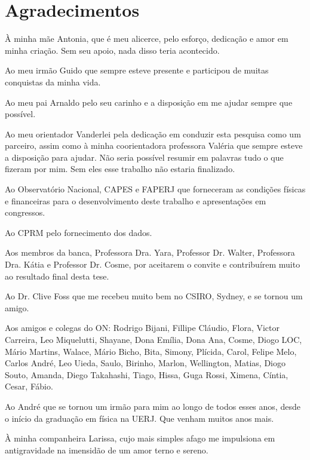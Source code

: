 \chapter*{Agradecimentos}

À minha mãe Antonia, que é meu alicerce, pelo esforço, dedicação e amor em minha criação. Sem seu apoio, nada disso teria acontecido.

Ao meu irmão Guido que sempre esteve presente e participou de muitas conquistas da minha vida.

Ao meu pai Arnaldo pelo seu carinho e a disposição em me ajudar sempre que possível.

Ao meu orientador Vanderlei pela dedicação em conduzir esta pesquisa como um parceiro, assim como à minha coorientadora professora Valéria que sempre esteve a disposição para ajudar. Não seria possível resumir em palavras tudo o que fizeram por mim. Sem eles esse trabalho não estaria finalizado.

Ao Observatório Nacional, CAPES e FAPERJ que forneceram as condições físicas e financeiras para o desenvolvimento deste trabalho e apresentações em congressos.

Ao CPRM pelo fornecimento dos dados.

Aos membros da banca, Professora Dra. Yara, Professor Dr. Walter, Professora Dra. Kátia e Professor Dr. Cosme, por aceitarem o convite e contribuírem muito ao resultado final desta tese.

Ao Dr. Clive Foss que me recebeu muito bem no CSIRO, Sydney, e se tornou um amigo. 

Aos amigos e colegas do ON: Rodrigo Bijani, Fillipe Cláudio, Flora, Victor Carreira, Leo Miquelutti, Shayane, Dona Emília, Dona Ana, Cosme, Diogo LOC, Mário Martins, Walace, Mário Bicho, Bita, Simony, Plícida, Carol, Felipe Melo, Carlos André, Leo Uieda, Saulo, Birinho, Marlon, Wellington, Matias, Diogo Souto, Amanda, Diego Takahashi, Tiago, Hissa, Guga Rossi, Ximena, Cíntia, Cesar, Fábio.

Ao André que se tornou um irmão para mim ao longo de todos esses anos, desde o início da graduação em física na UERJ. Que venham muitos anos mais.

À minha companheira Larissa, cujo mais simples afago me impulsiona em antigravidade na imensidão de um amor terno e sereno.
